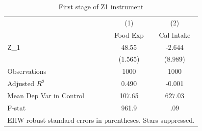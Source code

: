 \begin{table}[htbp]\centering
\caption{First stage of Z1 instrument}
\begin{tabular}{l*{2}{c}}
\hline\hline
                    &\multicolumn{1}{c}{(1)}&\multicolumn{1}{c}{(2)}\\
                    &\multicolumn{1}{c}{Food Exp}&\multicolumn{1}{c}{Cal Intake}\\
\hline
Z\_1                 &       48.55&      -2.644\\
                    &     (1.565)&     (8.989)\\
\hline
Observations        &        1000&        1000\\
Adjusted \(R^{2}\)  &       0.490&      -0.001\\
Mean Dep Var in Control&      107.65&      627.03\\
F-stat              &       961.9&         .09\\
\hline\hline
\multicolumn{3}{l}{\footnotesize EHW robust standard errors in parentheses. Stars suppressed.}\\
\end{tabular}
\end{table}
